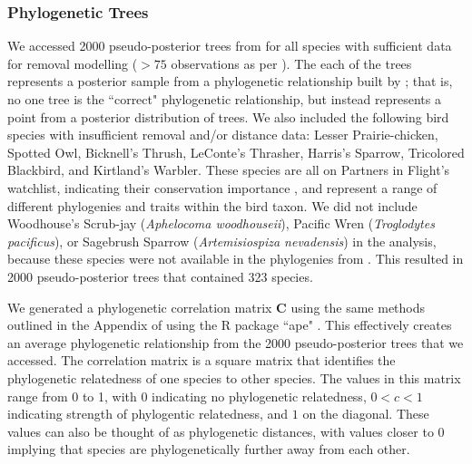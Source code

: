 \documentclass[12pt]{article}
\begin{document}
\subsubsection{Phylogenetic Trees}
\par We accessed 2000 pseudo-posterior trees from \citet{jetz_global_2012} for all species with sufficient data for removal modelling ($>75$ observations as per \cite{edwards_point_2023,solymos_evaluating_2018,buckland_introduction_2001}). 
The each of the trees represents a posterior sample from a phylogenetic relationship built by \citet{jetz_global_2012}; that is, no one tree is the ``correct" phylogenetic relationship, but instead represents a point from a posterior distribution of trees.
We also included the following bird species with insufficient removal and/or distance data: Lesser Prairie-chicken, Spotted Owl, Bicknell's Thrush, LeConte's Thrasher, Harris's Sparrow, Tricolored Blackbird, and Kirtland's Warbler. 
These species are all on Partners in Flight's watchlist, indicating their conservation importance \citep{will_handbook_2020}, and represent a range of different phylogenies and traits within the bird taxon.
We did not include Woodhouse's Scrub-jay (\textit{Aphelocoma woodhouseii}), Pacific Wren (\textit{Troglodytes pacificus}), or Sagebrush Sparrow (\textit{Artemisiospiza nevadensis}) in the analysis, because these species were not available in the phylogenies from \citet{jetz_global_2012}.
This resulted in 2000 pseudo-posterior trees that contained 323 species.

\par We generated a phylogenetic correlation matrix $\mathbf{C}$ using the same methods outlined in the Appendix of \citet{solymos_phylogeny_2018} using the R package ``ape" \citep{paradis_ape_2019}. 
This effectively creates an average phylogenetic relationship from the 2000 pseudo-posterior trees that we accessed. 
The correlation matrix is a square matrix that identifies the phylogenetic relatedness of one species to other species.
The values in this matrix range from 0 to 1, with 0 indicating no phylogenetic relatedness, $0 < c < 1$ indicating strength of phylogentic relatedness, and $1$ on the diagonal.
These values can also be thought of as phylogenetic distances, with values closer to 0 implying that species are phylogenetically further away from each other.
\end{document}

